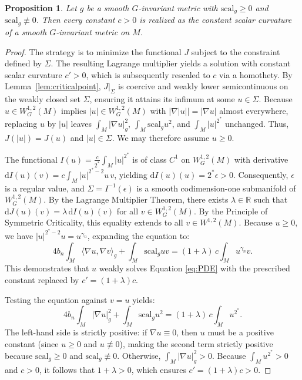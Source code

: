 \documentclass[12pt,a4paper]{amsart}
\theoremstyle{plain}
\newtheorem{proposition}[theorem]{Proposition}
\theoremstyle{definition}
\theoremstyle{remark}
\newcommand{\ga}{\mathit{g}} %
\begin{document}
\begin{proposition}\label{thm:invariantkazdan}
Let $\ga$ be a smooth $G$-invariant metric with $\mathrm{scal}_{\ga} \ge 0$ and $\mathrm{scal}_{\ga} \not\equiv 0$. Then every constant $c > 0$ is realized as the constant scalar curvature of a smooth $G$-invariant metric on $M$.
\end{proposition}
\begin{proof}
The strategy is to minimize the functional $J$ subject to the constraint defined by $\Sigma$. The resulting Lagrange multiplier yields a solution with constant scalar curvature $c'>0$, which is subsequently rescaled to $c$ via a homothety. By Lemma~\ref{lem:criticalpoint}, $J|_{\Sigma}$ is coercive and weakly lower semicontinuous on the weakly closed set $\Sigma$, ensuring it attains its infimum at some $u\in\Sigma$. Because $u \in W^{1,2}_G(M)$ implies $|u| \in W^{1,2}_G(M)$ with $|\nabla|u|| = |\nabla u|$ almost everywhere, replacing $u$ by $|u|$ leaves $\int_M|\nabla u|_{\ga}^2$, $\int_M\mathrm{scal}_{\ga} u^2$, and $\int_M|u|^{2^*}$ unchanged. Thus, $J(|u|) = J(u)$ and $|u| \in \Sigma$. We may therefore assume $u \ge 0$.

The functional $I(u) = \frac{c}{2^*}\int_M|u|^{2^*}$ is of class $C^1$ on $W^{1,2}_G(M)$ with derivative $\mathrm{d}I(u)(v) = c\int_M|u|^{2^*-2}u\,v$, yielding $\mathrm{d}I(u)(u) = 2^*\epsilon > 0$. Consequently, $\epsilon$ is a regular value, and $\Sigma = I^{-1}(\epsilon)$ is a smooth codimension-one submanifold of $W^{1,2}_G(M)$. By the Lagrange Multiplier Theorem, there exists $\lambda \in \mathbb{R}$ such that $\mathrm{d}J(u)(v) = \lambda\,\mathrm{d}I(u)(v)$ for all $v \in W^{1,2}_G(M)$. By the Principle of Symmetric Criticality, this equality extends to all $v \in W^{1,2}(M)$. Because $u \ge 0$, we have $|u|^{2^*-2}u = u^{\gamma_n}$, expanding the equation to:
$$4b_n\int_M \langle \nabla u,\nabla v\rangle_{\ga} + \int_M\mathrm{scal}_{\ga}uv = (1+\lambda)\,c\int_M u^{\gamma_n}v.$$
This demonstrates that $u$ weakly solves Equation \eqref{eq:PDE} with the prescribed constant replaced by $c' = (1+\lambda)c$.

Testing the equation against $v=u$ yields:
$$4b_n\int_M |\nabla u|_{\ga}^2 + \int_M\mathrm{scal}_{\ga}u^2 = (1+\lambda)\,c\int_M u^{2^*}.$$
The left-hand side is strictly positive: if $\nabla u \equiv 0$, then $u$ must be a positive constant (since $u \ge 0$ and $u \not\equiv 0$), making the second term strictly positive because $\mathrm{scal}_{\ga} \ge 0$ and $\mathrm{scal}_{\ga} \not\equiv 0$. Otherwise, $\int_M|\nabla u|_{\ga}^2 > 0$. Because $\int_M u^{2^*} > 0$ and $c > 0$, it follows that $1+\lambda > 0$, which ensures $c' = (1+\lambda)c > 0$.


\end{proof}
\end{document}
